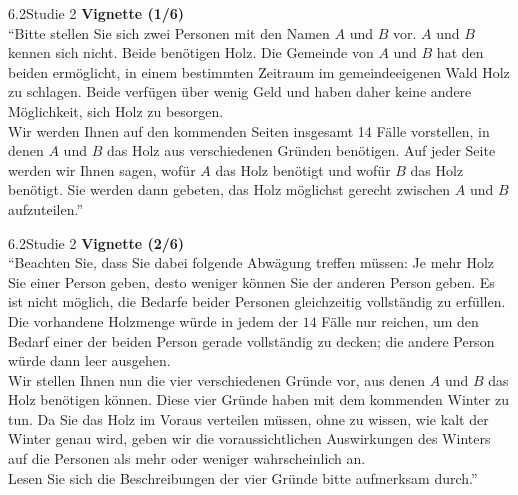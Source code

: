 \documentclass[xcolor=table,9pt,aspectratio=169]{beamer}
\begin{document}
\begin{frame}{\vspace*{10mm}6.2\hspace*{1em}Studie 2}
\textbf{Vignette (1/6)}\\
\medskip
\enquote{Bitte stellen Sie sich zwei Personen mit den Namen $A$ und $B$ vor. $A$ und $B$ kennen sich nicht. Beide benötigen Holz. Die Gemeinde von $A$ und $B$ hat den beiden ermöglicht, in einem bestimmten Zeitraum im gemeindeeigenen Wald Holz zu schlagen. Beide verfügen über wenig Geld und haben daher keine andere Möglichkeit, sich Holz zu besorgen.\\
\medskip
Wir werden Ihnen auf den kommenden Seiten insgesamt 14 Fälle vorstellen, in denen $A$ und $B$ das Holz aus verschiedenen Gründen benötigen. Auf jeder Seite werden wir Ihnen sagen, wofür $A$ das Holz benötigt und wofür $B$ das Holz benötigt. Sie werden dann gebeten, das Holz möglichst gerecht zwischen $A$ und $B$ aufzuteilen.}
\end{frame}


\begin{frame}{\vspace*{10mm}6.2\hspace*{1em}Studie 2}
\textbf{Vignette (2/6)}\\
\medskip
\enquote{Beachten Sie, dass Sie dabei folgende Abwägung treffen müssen: Je mehr Holz Sie einer Person geben, desto weniger können Sie der anderen Person geben. Es ist nicht möglich, die Bedarfe beider Personen gleichzeitig vollständig zu erfüllen. Die vorhandene Holzmenge würde in jedem der $14$ Fälle nur reichen, um den Bedarf einer der beiden Person gerade vollständig zu decken; die andere Person würde dann leer ausgehen.\\
\medskip
Wir stellen Ihnen nun die vier verschiedenen Gründe vor, aus denen $A$ und $B$ das Holz benötigen können. Diese vier Gründe haben mit dem kommenden Winter zu tun. Da Sie das Holz im Voraus verteilen müssen, ohne zu wissen, wie kalt der Winter genau wird, geben wir die voraussichtlichen Auswirkungen des Winters auf die Personen als mehr oder weniger wahrscheinlich an.\\
\medskip
Lesen Sie sich die Beschreibungen der vier Gründe bitte aufmerksam durch.}
\end{frame}
\end{document}
